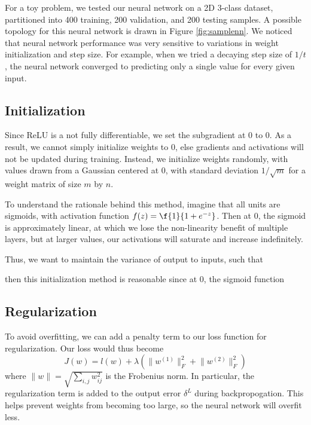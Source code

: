 \documentclass{article}
\begin{document}
\begin{multicols}{2}
For a toy problem, we tested our neural network on a 2D 3-class dataset, partitioned
into 400 training, 200 validation, and 200 testing samples.
A possible topology for this neural network is drawn in Figure \ref{fig:samplenn}.
We noticed that neural network  performance was very sensitive to 
variations in weight initialization and step size.
For example, when we tried a decaying step size of $1/t$, the neural network
converged to predicting only a single value for every given input.

\subsection{Initialization}

Since ReLU is a not fully differentiable, we set the subgradient at 0 to 0.
As a result, we cannot simply initialize weights to 0, else gradients and activations 
will not be updated during training. Instead, we initialize weights randomly,
with values drawn from a Gaussian centered at 0, with standard deviation $1/\sqrt{m}$
for a weight matrix of size $m$ by $n$.

To understand the rationale behind this method, imagine that all units are sigmoids,
with activation function $f(z) = \f{1}{1+e^{-z}}$. Then at 0, the sigmoid is approximately
linear, at which we lose the non-linearity benefit of multiple layers, but at larger values,
our activations will saturate and increase indefinitely.

Thus, we want to maintain the variance of output to inputs, such that 

then this initialization method is reasonable
since at 0, the sigmoid function  

\subsection{Regularization}

To avoid overfitting, we can add a penalty term to our loss function for regularization.
Our loss would thus become
\begin{equation}
    J(w) = l(w) +
      \lambda(\lVert w^{(1)} \rVert^2_F + \lVert w^{(2)} \rVert^2_F)
\end{equation}
where $\lVert w\rVert = \sqrt{\sum_{i,j}{w_{ij}^2}}$ is the Frobenius norm.
In particular, the regularization term is added to the output error $\delta^L$
during backpropogation.
This helps prevent weights from becoming too large, so the neural network will
overfit less.


\end{multicols}
\end{document}
